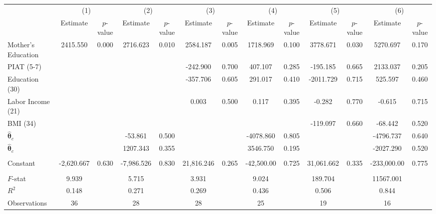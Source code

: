 \begin{tabular}{lcccccccccccc} \toprule
 & \multicolumn{2}{c}{(1)}  &  \multicolumn{2}{c}{(2)}  &  \multicolumn{2}{c}{(3)}  &  \multicolumn{2}{c}{(4)}  & \multicolumn{2}{c}{(5)} & \multicolumn{2}{c}{(6)} \\  
 & Estimate & $p$-value & Estimate & $p$-value & Estimate & $p$-value & Estimate & $p$-value & Estimate & $p$-value & Estimate & $p$-value \\ \midrule
Mother's Education &  2415.550 &     0.000 &  2716.623 &     0.010 &  2584.187 &     0.005 &  1718.969 &     0.100 &  3778.671 &     0.030 &  5270.697 &     0.170 \\  
PIAT (5-7) &         &         &         &         &  -242.900 &     0.700 &   407.107 &     0.285 &  -195.185 &     0.665 &  2133.037 &     0.205 \\  
Education (30) &         &         &         &         &  -357.706 &     0.605 &   291.017 &     0.410 & -2011.729 &     0.715 &   525.597 &     0.460 \\  
Labor Income (21) &         &         &         &         &     0.003 &     0.500 &     0.117 &     0.395 &    -0.282 &     0.770 &    -0.615 &     0.715 \\  
BMI (34) &         &         &         &         &         &         &         &         &  -119.097 &     0.660 &   -68.442 &     0.520 \\  
$\hat{\bm{\theta}}_c$ &         &         &   -53.861 &     0.500 &         &         & -4078.860 &     0.805 &         &         & -4796.737 &     0.640 \\  
$\hat{\bm{\theta}}_c$ &         &         &  1207.343 &     0.355 &         &         &  3546.750 &     0.195 &         &         & -2027.290 &     0.520 \\  \\
Constant  & -2,620.667 &     0.630 & -7,986.526 &     0.830 & 21,816.246 &     0.265 & -42,500.00 &     0.725 & 31,061.662 &     0.335 & -233,000.00 &     0.775 \\  \\ \midrule
$F$-stat &     9.939 &      &     5.715 &     &     3.931 &     &     9.024 &    &   189.704 &     & 11567.001 &     \\  
$R^2$ &     0.148 &     &     0.271 &    &     0.269 &      &     0.436 &     &     0.506 &      &     0.844 &    \\  
Observations &    36 &   &    28 &    &    28 &   &    25 &   &    19 &  &    16 &   \\  
\bottomrule \end{tabular}
